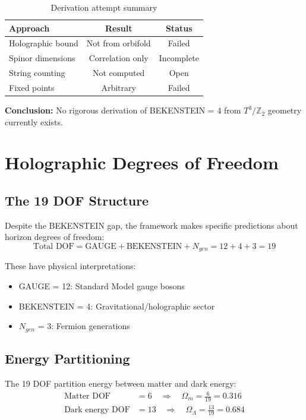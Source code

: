 \documentclass[12pt,a4paper]{article}
\begin{document}
\begin{table}[h]
\centering
\begin{tabular}{lcc}
\toprule
Approach & Result & Status \\
\midrule
Holographic bound & Not from orbifold & Failed \\
Spinor dimensions & Correlation only & Incomplete \\
String counting & Not computed & Open \\
Fixed points & Arbitrary & Failed \\
\bottomrule
\end{tabular}
\caption{Derivation attempt summary}
\end{table}

\textbf{Conclusion:} No rigorous derivation of BEKENSTEIN = 4 from $T^3/\mathbb{Z}_2$ geometry currently exists.

\section{Holographic Degrees of Freedom}

\subsection{The 19 DOF Structure}

Despite the BEKENSTEIN gap, the framework makes specific predictions about horizon degrees of freedom:
\begin{equation}
\text{Total DOF} = \text{GAUGE} + \text{BEKENSTEIN} + N_{gen} = 12 + 4 + 3 = 19
\end{equation}

These have physical interpretations:
\begin{itemize}
    \item GAUGE = 12: Standard Model gauge bosons
    \item BEKENSTEIN = 4: Gravitational/holographic sector
    \item $N_{gen}$ = 3: Fermion generations
\end{itemize}

\subsection{Energy Partitioning}

The 19 DOF partition energy between matter and dark energy:
\begin{align}
\text{Matter DOF} &= 6 \quad \Rightarrow \quad \Omega_m = \frac{6}{19} = 0.316 \\
\text{Dark energy DOF} &= 13 \quad \Rightarrow \quad \Omega_\Lambda = \frac{13}{19} = 0.684
\end{align}
\end{document}
